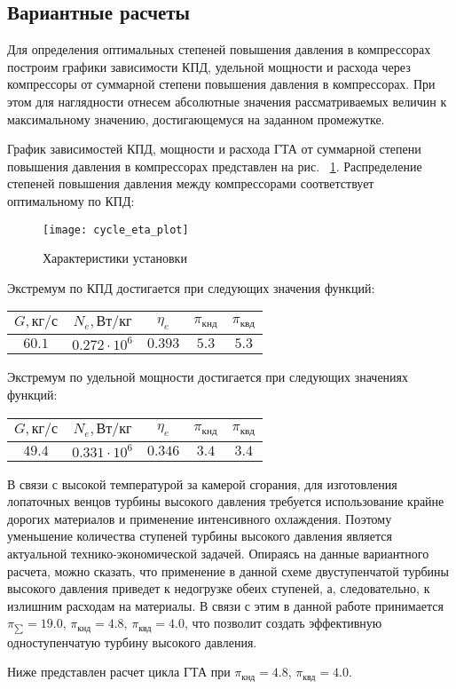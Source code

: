 \subsection{Вариантные расчеты}
Для определения оптимальных степеней повышения давления в компрессорах
построим графики зависимости КПД, удельной мощности и расхода через компрессоры от суммарной степени повышения давления в компрессорах.
При этом для наглядности отнесем абсолютные значения рассматриваемых величин к максимальному значению,
достигающемуся на заданном промежутке.

График зависимостей КПД,
мощности и расхода ГТА от суммарной степени повышения давления в компрессорах представлен на рис. ~\ref{img:cycle_eta_plot}.
Распределение степеней повышения давления между компрессорами соответствует оптимальному по КПД:
\begin{figure}[H]
    \centering
	\texttt{[image: cycle\_eta\_plot]}
	\caption{Характеристики установки}
	\label{img:cycle_eta_plot}
\end{figure}

Экстремум по КПД достигается при следующих значения функций:
\begin{center}
	\begin{tabular}{|c|c|c|c|c|}
	\hline
		$G, кг/с$ & $N_e, Вт/кг$ & $\eta_e$ & $\pi_{кнд}$ & $\pi_{квд}$ \\ \hline
		$60.1$ &
		$0.272 \cdot 10^6$ &
		$0.393$ &
		$5.3$ &
		$5.3$ \\ \hline
	\end{tabular}
\end{center}

Экстремум по удельной мощности достигается при следующих значениях функций:
\begin{center}
	\begin{tabular}{|c|c|c|c|c|}
	\hline
		$G, кг/с$ & $N_e, Вт/кг$ & $\eta_e$ & $\pi_{кнд}$ & $\pi_{квд}$ \\ \hline
		$49.4$ &
		$0.331 \cdot 10^6$ &
		$0.346$ &
		$3.4$ &
		$3.4$ \\ \hline
	\end{tabular}
\end{center}

В связи с высокой температурой за камерой сгорания, для изготовления лопаточных венцов турбины высокого давления требуется
использование крайне дорогих материалов и применение интенсивного охлаждения. Поэтому уменьшение количества ступеней
турбины высокого давления является актуальной технико-экономической задачей. Опираясь на данные вариантного расчета,
можно сказать, что применение в данной схеме двуступенчатой турбины высокого давления приведет к недогрузке
обеих ступеней, а, следовательно, к излишним расходам на материалы. В связи с этим в данной работе принимается
$\pi_{\sum} = 19.0$, $\pi_{кнд} = 4.8$, $\pi_{квд} = 4.0$,
что позволит создать эффективную одноступенчатую турбину высокого давления.

Ниже представлен расчет цикла ГТА при $\pi_{кнд} = 4.8$, $\pi_{квд} = 4.0$.
